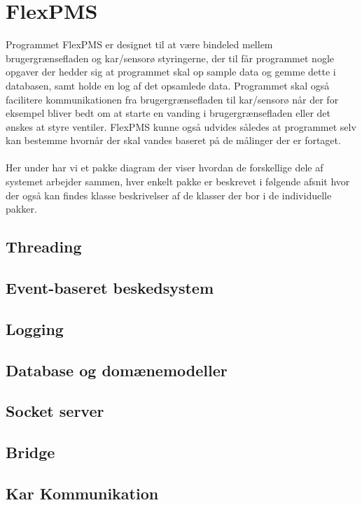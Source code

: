 \section{FlexPMS}
Programmet FlexPMS er designet til at være bindeled mellem brugergrænsefladen og kar/sensorø styringerne, der til får programmet nogle opgaver der hedder sig at programmet skal op sample data og gemme dette i databasen, samt holde en log af det opsamlede data. Programmet skal også facilitere kommunikationen fra brugergrænsefladen til kar/sensorø når der for eksempel bliver bedt om at starte en vanding i brugergrænsefladen eller det ønskes at styre ventiler. FlexPMS kunne også udvides således at programmet selv kan bestemme hvornår der skal vandes baseret på de målinger der er fortaget.\\\\

Her under har vi et pakke diagram der viser hvordan de forskellige dele af systemet arbejder sammen, hver enkelt pakke er beskrevet i følgende afsnit hvor der også kan findes klasse beskrivelser af de klasser der bor i de individuelle pakker.


\subsection{Threading}


\subsection{Event-baseret beskedsystem}


\subsection{Logging}


\subsection{Database og domænemodeller}


\subsection{Socket server}


\subsection{Bridge}


\subsection{Kar Kommunikation}

